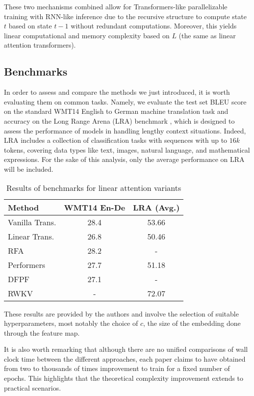 These two mechanisms combined allow for Transformers-like parallelizable training with RNN-like inference
due to the recursive structure to compute state $t$ based on state $t-1$ without redundant computations. Moreover, this yields linear computational and memory complexity based on $L$ (the same as linear attention transformers).

\subsection{Benchmarks}

In order to assess and compare the methods we just introduced, it is worth evaluating them on common tasks. Namely, we evaluate the test set BLEU score on the standard WMT14  English to German machine translation task \cite{bojar-EtAl:2014:W14-33} and accuracy on the Long Range Arena (LRA) benchmark \cite{tay2020long}, which is designed to assess the performance of
models in handling lengthy context situations. Indeed, LRA includes a collection of classification tasks with sequences with up to $16k$ tokens, covering data types like text, images, natural language, and mathematical expressions. For the sake of this analysis, only the average performance on LRA will be included.

\begin{table}[ht!]
\centering
\begin{tabular}{l c c} 
\hline
  Method & WMT14 En-De & LRA (Avg.) \\
\hline
    Vanilla Trans. & 28.4 & 53.66 \\
    Linear Trans. & 26.8  & 50.46 \\
    RFA & 28.2 & - \\
    Performers & 27.7 & 51.18 \\
    DFPF & 27.1 & - \\
    RWKV & - &  72.07 \\
\hline
\end{tabular}
\caption{Results of benchmarks for linear attention variants}
\label{table:linear}
\end{table}

These results are provided by the authors and involve the selection of suitable hyperparameters, most notably the choice of $c$, the size of the embedding done through the feature map.

It is also worth remarking that although there are no unified comparisons of wall clock time between the different approaches, each paper claims to have obtained from two to thousands of times improvement to train for a fixed number of epochs. This highlights that the theoretical complexity improvement extends to practical scenarios. 


